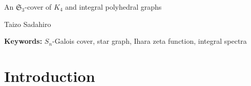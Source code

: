 \documentclass[lualatex,12pt]{article}
\begin{document}
\begin{center}
 {\large An ${\mathfrak S}_3$-cover of $K_4$ and integral polyhedral graphs}

 \bigskip
 Taizo Sadahiro
\end{center}

\begin{abstract}
We first show that the star graph
$
 X_n=\mathrm{Cay}(\mathfrak S_{n+1},S),
$
where $S=\{(i, n+1)\,|\, 1\leq i\leq n\}$,
is an ${\mathfrak S}_n$-Galois cover of the complete graph $K_{n+1}$.
We then study the case $n=3$ in detail, 
where the intermediate covers are the cube graph and the truncated tetrahedron graph.
Using the factorization of the Ihara zeta function along coverings,
we derive a multiset identity relating the adjacency spectra of these graphs,
yielding a unified explanation for the integrality of their spectra.
This construction yields an explicit integral ${\mathfrak S}_3$-cover of $K_5$.
\end{abstract}



\noindent
{\bf Keywords:} $S_n$-Galois cover, star graph, Ihara zeta function, integral spectra


%
%
%
%

\section{Introduction}
\end{document}
